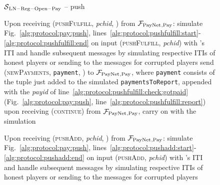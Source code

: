 \begin{figure}[!htbp]
  \begin{simulatorbox}{$\mathcal{S}{}_{\mathrm{LN - Reg - Open - Pay}}$ -- push}
    \begin{algorithmic}[1]
      \State Upon receiving (\textsc{pushFulfill}, \textit{pchid}, \alice) from
      $\mathcal{F}_{\mathrm{PayNet}}{}_{\mathrm{, Pay}}$:
      \Indent
        \State simulate Fig.~\ref{alg:protocol:pay:push},
        lines~\ref{alg:protocol:pushfulfill:start}-\ref{alg:protocol:pushfulfill:end}
        on input (\textsc{pushFulfill}, \textit{pchid}) with \alice's ITI and
        handle subsequent messages by simulating respective ITIs of honest
        players or sending to \adversary{} the messages for corrupted players
        \label{alg:sim:push:fulfill}
        \label{alg:sim:pushfulfill:report:if}
          \State send (\textsc{newPayments}, \texttt{payment}, \alice) to
          $\mathcal{F}_{\mathrm{PayNet}}{}_{\mathrm{, Pay}}$, where \texttt{payment} consists of the
          tuple just added to the simulated \texttt{paymentsToReport}, appended
          with the \textit{payid} of
          line~\ref{alg:protocol:pushfulfill:check:gotpaid}
          (Fig.~\ref{alg:protocol:pay:push},
          line~\ref{alg:protocol:pushfulfill:report})
          \label{alg:sim:pushfulfill:report}
          \State upon receiving (\textsc{continue}) from $\mathcal{F}_{\mathrm{PayNet}}{}_{\mathrm{,
          Pay}}$, carry on with the simulation
        \EndIf
      \EndIndent
      \Statex

      \State Upon receiving (\textsc{pushAdd}, \textit{pchid}, \alice) from
      $\mathcal{F}_{\mathrm{PayNet}}{}_{\mathrm{, Pay}}$:
      \Indent
        \State simulate Fig.~\ref{alg:protocol:pay:push},
        lines~\ref{alg:protocol:pushadd:start}-\ref{alg:protocol:pushadd:end} on
        input (\textsc{pushAdd}, \textit{pchid}) with \alice's ITI and handle
        subsequent messages by simulating respective ITIs of honest players or
        sending to \adversary{} the messages for corrupted players
        \label{alg:sim:push:add}
      \EndIndent
      \Statex


\end{algorithmic}
\end{simulatorbox}
\end{figure}

